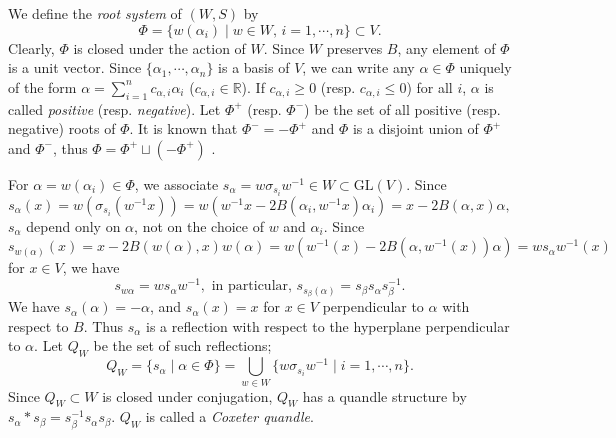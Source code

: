 \documentclass{amsart}
\theoremstyle{definition}
\theoremstyle{remark}
\numberwithin{equation}{section}
\begin{document}
We define the \emph{root system} of $(W, S)$ by 
\[
\Phi = \{ w (\alpha_i) \mid w \in W, \, i = 1, \cdots , n \} \subset V.
\]
Clearly, $\Phi$ is closed under the action of $W$. 
Since $W$ preserves $B$, any element of $\Phi$ is a unit vector.
Since $\{ \alpha_1, \cdots, \alpha_n \}$ is a basis of $V$, 
we can write any $\alpha \in \Phi$ uniquely of the form  
$\alpha  = \sum_{i=1}^n c_{\alpha,i} \alpha_i$ ($c_{\alpha, i} \in \mathbb{R}$).
If $c_{\alpha, i} \geq 0$ (resp. $c_{\alpha, i} \leq 0$) for all $i$, 
$\alpha$ is called \emph{positive} (resp. \emph{negative}).
Let $\Phi^+$ (resp. $\Phi^-$) be the set of all positive (resp. negative) roots of $\Phi$.
It is known that $\Phi^- = - \Phi^+$ and $\Phi$ is a disjoint union of 
$\Phi^{+}$ and $\Phi^{-}$, thus $\Phi = \Phi^+ \sqcup (-\Phi^+)$ \cite[\S 5.4]{Humphreys}.

For $\alpha = w(\alpha_i)  \in \Phi$, we associate 
$s_{\alpha} =  w \sigma_{s_i} w^{-1} \in W \subset \mathrm{GL}(V)$.
Since 
\begin{equation}
\label{eq:reflection}
s_{\alpha} (x) = w (\sigma_{s_i} (w^{-1} x))
= w ( w^{-1} x  - 2 B(\alpha_i, w^{-1} x) \alpha_i )
= x - 2 B(\alpha, x) \alpha,
\end{equation}
$s_{\alpha}$ depend only on $\alpha$, 
not on the choice of $w$ and $\alpha_{i}$.
Since $s_{w (\alpha)}(x) = x - 2 B(w (\alpha), x) w (\alpha)
= w( w^{-1} (x) - 2 B(\alpha, w^{-1} (x)) \alpha) 
= w s_{\alpha} w^{-1} (x)$ for $x \in V$, we have
\[
s_{w \alpha} = w s_{\alpha} w^{-1}, \textrm{ in particular, } 
s_{s_\beta(\alpha)} = s_{\beta} s_{\alpha} s_{\beta}^{-1}.
\]
We have $s_{\alpha}(\alpha) = - \alpha $, 
and $s_{\alpha}(x) = x$ for $x \in V$ perpendicular to $\alpha$ with respect to $B$.
Thus $s_{\alpha}$ is a reflection with respect to the hyperplane perpendicular to $\alpha$. 
Let $Q_W$ be the set of such reflections; 
\[
Q_W = \{ s_\alpha \mid \alpha \in \Phi \} 
= \bigcup_{w \in W} \{ w \sigma_{s_i} w^{-1} \mid  i = 1, \cdots, n \}.
\]
Since $Q_W \subset W$ is closed under conjugation, $Q_W$ has a quandle structure by 
$s_{\alpha} * s_{\beta} = s_{\beta}^{-1} s_{\alpha} s_{\beta}$.
$Q_W$ is called a \emph{Coxeter quandle}.
\end{document}

